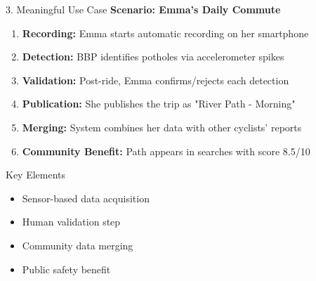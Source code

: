 \documentclass[aspectratio=169, 10pt]{beamer}
\begin{document}
\begin{frame}{3. Meaningful Use Case}
    \textbf{Scenario: Emma's Daily Commute}
    
    \vspace{0.3cm}
    \begin{enumerate}
        \item \textbf{Recording:} Emma starts automatic recording on her smartphone
        \item \textbf{Detection:} BBP identifies potholes via accelerometer spikes
        \item \textbf{Validation:} Post-ride, Emma confirms/rejects each detection
        \item \textbf{Publication:} She publishes the trip as "River Path - Morning"
        \item \textbf{Merging:} System combines her data with other cyclists' reports
        \item \textbf{Community Benefit:} Path appears in searches with score 8.5/10
    \end{enumerate}
    
    \vspace{0.3cm}
    \begin{block}{Key Elements}
        \begin{itemize}
            \item Sensor-based data acquisition
            \item Human validation step
            \item Community data merging
            \item Public safety benefit
        \end{itemize}
    \end{block}
\end{frame}
\end{document}
